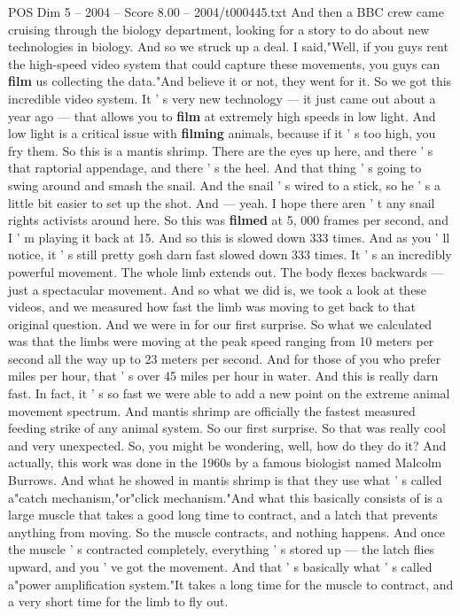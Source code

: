 \begin{textsample}{POS Dim 5 – 2004 – Score 8.00 – 2004/t000445.txt}
And then a BBC crew came cruising through the biology department, looking for a story to do about new technologies in biology.
And so we struck up a deal.
I said,"Well, if you guys rent the high-speed video system that could capture these movements, you guys can \textbf{film} us collecting the data."And believe it or not, they went for it.
So we got this incredible video system.
It ' s very new technology — it just came out about a year ago — that allows you to \textbf{film} at extremely high speeds in low light.
And low light is a critical issue with \textbf{filming} animals, because if it ' s too high, you fry them.
So this is a mantis shrimp.
There are the eyes up here, and there ' s that raptorial appendage, and there ' s the heel.
And that thing ' s going to swing around and smash the snail.
And the snail ' s wired to a stick, so he ' s a little bit easier to set up the shot.
And — yeah.
I hope there aren ' t any snail rights activists around here.
So this was \textbf{filmed} at 5, 000 frames per second, and I ' m playing it back at 15.
And so this is slowed down 333 times.
And as you ' ll notice, it ' s still pretty gosh darn fast slowed down 333 times.
It ' s an incredibly powerful movement.
The whole limb extends out.
The body flexes backwards — just a spectacular movement.
And so what we did is, we took a look at these videos, and we measured how fast the limb was moving to get back to that original question.
And we were in for our first surprise.
So what we calculated was that the limbs were moving at the peak speed ranging from 10 meters per second all the way up to 23 meters per second.
And for those of you who prefer miles per hour, that ' s over 45 miles per hour in water.
And this is really darn fast.
In fact, it ' s so fast we were able to add a new point on the extreme animal movement spectrum.
And mantis shrimp are officially the fastest measured feeding strike of any animal system.
So our first surprise.
So that was really cool and very unexpected.
So, you might be wondering, well, how do they do it?
And actually, this work was done in the 1960s by a famous biologist named Malcolm Burrows.
And what he showed in mantis shrimp is that they use what ' s called a"catch mechanism,"or"click mechanism."And what this basically consists of is a large muscle that takes a good long time to contract, and a latch that prevents anything from moving.
So the muscle contracts, and nothing happens.
And once the muscle ' s contracted completely, everything ' s stored up — the latch flies upward, and you ' ve got the movement.
And that ' s basically what ' s called a"power amplification system."It takes a long time for the muscle to contract, and a very short time for the limb to fly out.

\end{textsample}
